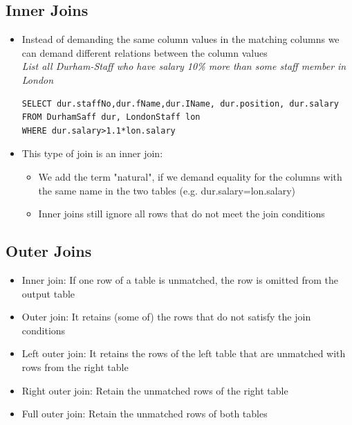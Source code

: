\documentclass{article}[18pt]
\begin{document}
\subsection{Inner Joins}
\begin{itemize}
	\item Instead of demanding the same column values in the matching columns we can demand different relations between the column values\\
	\textit{List all Durham-Staff who have salary 10\% more than some staff member in London}
\begin{verbatim}
SELECT dur.staffNo,dur.fName,dur.IName, dur.position, dur.salary
FROM DurhamSaff dur, LondonStaff lon
WHERE dur.salary>1.1*lon.salary
\end{verbatim}
	\item This type of join is an inner join:
	\begin{itemize}
		\item We add the term "natural", if we demand equality for the columns with the same name in the two tables (e.g. dur.salary=lon.salary)
		\item Inner joins still ignore all rows that do not meet the join conditions
	\end{itemize}
\end{itemize}
\subsection{Outer Joins}
\begin{itemize}
	\item Inner join: If one row of a table is unmatched, the row is omitted from the output table
	\item Outer join: It retains (some of) the rows that do not satisfy the join conditions
	\item Left outer join: It retains the rows of the left table that are unmatched with rows from the right table
	\item Right outer join: Retain the unmatched rows of the right table
	\item Full outer join: Retain the unmatched rows of both tables
\end{itemize}
\end{document}
